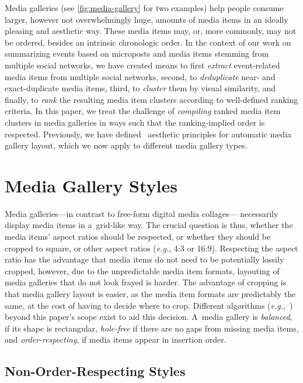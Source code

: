 \documentclass{sig-alternate}
\begin{document}
Media galleries (see \autoref{fig:media-gallery} for two examples)
help people consume larger, however not overwhelmingly huge,
amounts of media items in an ideally pleasing and aesthetic way.
These media items may, or, more commonly, may not be ordered,
besides an intrinsic chronologic order.
In the context of our work on summarizing events
based on microposts and media items stemming from
multiple social networks, we have created means
to first \emph{extract} event-related media items
from multiple social networks, second, to
\emph{deduplicate} near- and exact-duplicate media items,
third, to \emph{cluster} them by visual similarity, and
finally, to \emph{rank} the resulting media item clusters
according to well-defined ranking criteria.
In this paper, we treat the challenge of \emph{compiling}
ranked media item clusters in media galleries in ways
such that the ranking-implied order is respected.
Previously, we have defined~\cite{steiner2012definingaesthetic}
aesthetic principles for automatic media gallery layout,
which we now apply to different media gallery types.

\section{Media Gallery Styles}

Media galleries---in contrast to free-form digital media collages---%
necessarily display media items in a~grid-like way.
The crucial question is thus, whether the media items' aspect ratios
should be respected, or whether they should be cropped to square,
or other aspect ratios (\emph{e.g.}, 4:3 or 16:9).
Respecting the aspect ratio has the advantage that media items
do not need to be potentially lossily cropped,
however, due to the unpredictable media item formats,
layouting of media galleries
that do not look frayed is harder.
The advantage of cropping is that media gallery layout is easier,
as the media item formats are predictably the same,
at the cost of having to decide where to crop.
Different algorithms (\emph{e.g.},~\cite{suh2003thumbnail})
beyond this paper's scope exist to aid this decision.
A~media gallery is \emph{balanced}, if its shape is rectangular,
\emph{hole-free} if there are no gaps from missing media items,
and \emph{order-respecting},
if media items appear in insertion order.

\subsection{Non-Order-Respecting Styles}
\end{document}
